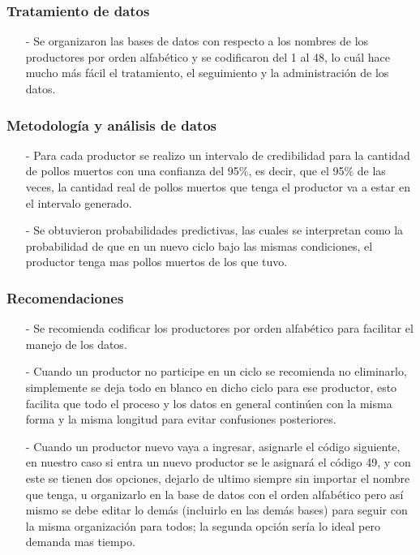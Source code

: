 \documentclass[11pt]{beamer}
\begin{document}
\begin{frame}
\frametitle{Tratamiento de datos}
\begin{itemize}
\item[-]Se organizaron las bases de datos con respecto a los nombres de los productores por orden alfabético y se codificaron del 1 al 48, lo cuál hace mucho más fácil el tratamiento, el seguimiento y la administración de los datos.
\end{itemize}
\end{frame}

\begin{frame}
\frametitle{Metodología y análisis de datos}
\begin{itemize}
\item[-]Para cada productor se realizo un intervalo de credibilidad para la cantidad de pollos muertos con una confianza del 95\%, es decir, que el 95\% de las veces, la cantidad real de pollos muertos que tenga el productor va a estar en el intervalo generado.
\item[-]Se obtuvieron probabilidades predictivas, las cuales se interpretan como la probabilidad de que en un nuevo ciclo bajo las mismas condiciones, el productor tenga mas pollos muertos de los que tuvo.
\end{itemize}
\end{frame}

\begin{frame}
\frametitle{Recomendaciones}
\begin{itemize}
\item[-]Se recomienda codificar los productores por orden alfabético para facilitar el manejo de los datos.
\item[-]Cuando un productor no participe en un ciclo se recomienda no eliminarlo, simplemente se deja todo en blanco en dicho ciclo para ese productor, esto facilita que todo el proceso y los datos en general continúen con la misma forma y la misma longitud para evitar confusiones posteriores.
\item[-]Cuando un productor nuevo vaya a ingresar, asignarle el código siguiente, en nuestro caso si entra un nuevo productor se le asignará el código 49, y con este se tienen dos opciones, dejarlo de ultimo siempre sin importar el nombre que tenga, u organizarlo en la base de datos con el orden alfabético pero así mismo se debe editar lo demás (incluirlo en las demás bases) para seguir con la misma organización para todos; la segunda opción sería lo ideal pero demanda mas tiempo.
\end{itemize}
\end{frame}
\end{document}

